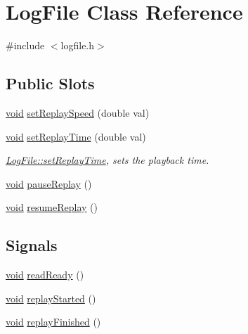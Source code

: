 \hypertarget{class_log_file}{\section{\-Log\-File \-Class \-Reference}
\label{class_log_file}
}


{\ttfamily \#include $<$logfile.\-h$>$}

\subsection*{\-Public \-Slots}
\begin{DoxyCompactItemize}
\item 
\hyperlink{group___u_a_v_objects_plugin_ga444cf2ff3f0ecbe028adce838d373f5c}{void} \hyperlink{class_log_file_ab7a03016cf2c61cfe5cf7b477e9b3de5}{set\-Replay\-Speed} (double val)
\item 
\hyperlink{group___u_a_v_objects_plugin_ga444cf2ff3f0ecbe028adce838d373f5c}{void} \hyperlink{class_log_file_a1b02fa57111680a530d15abaa87e4d11}{set\-Replay\-Time} (double val)
\begin{DoxyCompactList}\small\item\em \hyperlink{class_log_file_a1b02fa57111680a530d15abaa87e4d11}{\-Log\-File\-::set\-Replay\-Time}, sets the playback time. \end{DoxyCompactList}\item 
\hyperlink{group___u_a_v_objects_plugin_ga444cf2ff3f0ecbe028adce838d373f5c}{void} \hyperlink{class_log_file_a148ec54d47b9dc4fec33058e4c849240}{pause\-Replay} ()
\item 
\hyperlink{group___u_a_v_objects_plugin_ga444cf2ff3f0ecbe028adce838d373f5c}{void} \hyperlink{class_log_file_a52d5f07ff960070107e6f19d0fb7a8f5}{resume\-Replay} ()
\end{DoxyCompactItemize}
\subsection*{\-Signals}
\begin{DoxyCompactItemize}
\item 
\hyperlink{group___u_a_v_objects_plugin_ga444cf2ff3f0ecbe028adce838d373f5c}{void} \hyperlink{class_log_file_a85878eac521376c7251e56fb9fd3a8ea}{read\-Ready} ()
\item 
\hyperlink{group___u_a_v_objects_plugin_ga444cf2ff3f0ecbe028adce838d373f5c}{void} \hyperlink{class_log_file_ac5942e468655732a7b3e6d0492c978b8}{replay\-Started} ()
\item 
\hyperlink{group___u_a_v_objects_plugin_ga444cf2ff3f0ecbe028adce838d373f5c}{void} \hyperlink{class_log_file_a2ec76a32cecae257dda0682cab448572}{replay\-Finished} ()
\end{DoxyCompactItemize}
